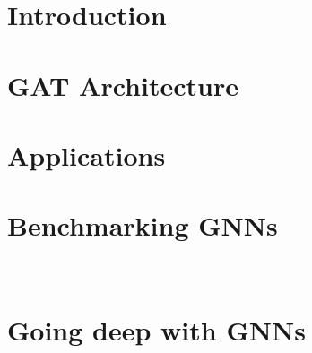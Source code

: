 \documentclass[11pt,oneside]{book}
\begin{document}


\clearpage
\newpage

\chapter*{Introduction}


\chapter*{GAT Architecture}


\chapter*{Applications}


\chapter*{Benchmarking GNNs}
 \\

\chapter*{Going deep with GNNs}
 \\ 

\newpage
{}

\renewcommand\bibname{References}

\end{document}
